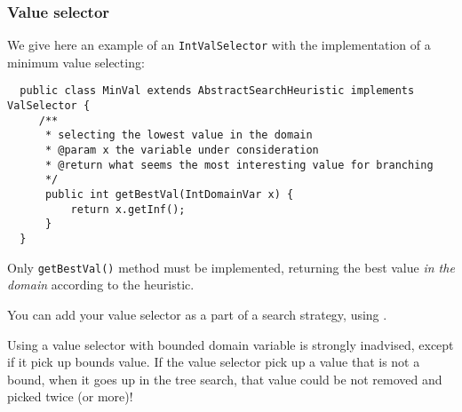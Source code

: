 \subsubsection{Value selector}\label{advanced:valueselector}\hypertarget{advanced:valueselector}{}
We give here an example of an \texttt{IntValSelector} with the implementation of a minimum value selecting:
\begin{lstlisting}
  public class MinVal extends AbstractSearchHeuristic implements ValSelector {
	 /**
      * selecting the lowest value in the domain
      * @param x the variable under consideration
      * @return what seems the most interesting value for branching
      */
	  public int getBestVal(IntDomainVar x) {
          return x.getInf();
	  }
  }
\end{lstlisting}
Only \texttt{getBestVal()} method must be implemented, returning the best value \emph{in the domain} according to the heuristic.

You can add your value selector as a part of a search strategy, using .

\begin{note}
Using a value selector with bounded domain variable is strongly inadvised, except if it pick up bounds value. If the value selector pick up a value that is not a bound, when it goes up in the tree search, that value could be not removed and picked twice (or more)!
\end{note} 

